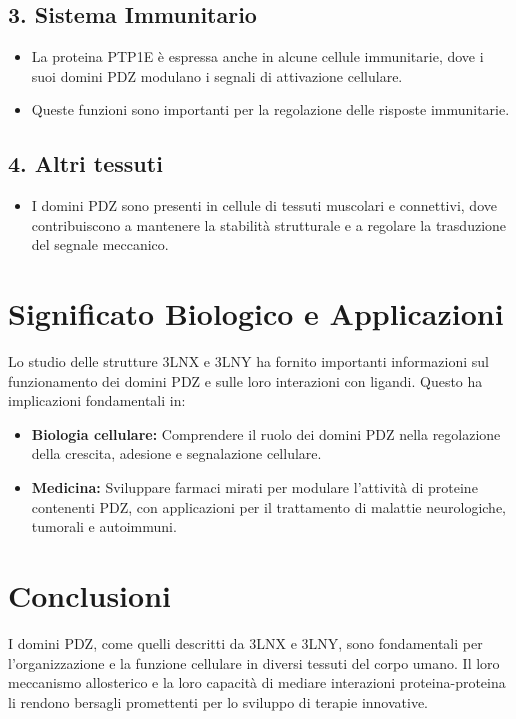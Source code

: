 \documentclass[Lau,binding=0.6cm,oneside,noexaminfo]{sapthesis}
\begin{document}
\subsection{3. Sistema Immunitario}
\begin{itemize}
    \item La proteina PTP1E è espressa anche in alcune cellule immunitarie, dove i suoi domini PDZ modulano i segnali di attivazione cellulare.
    \item Queste funzioni sono importanti per la regolazione delle risposte immunitarie.
\end{itemize}

\subsection{4. Altri tessuti}
\begin{itemize}
    \item I domini PDZ sono presenti in cellule di tessuti muscolari e connettivi, dove contribuiscono a mantenere la stabilità strutturale e a regolare la trasduzione del segnale meccanico.
\end{itemize}

\section{Significato Biologico e Applicazioni}
Lo studio delle strutture 3LNX e 3LNY ha fornito importanti informazioni sul funzionamento dei domini PDZ e sulle loro interazioni con ligandi. Questo ha implicazioni fondamentali in:
\begin{itemize}
    \item \textbf{Biologia cellulare:} Comprendere il ruolo dei domini PDZ nella regolazione della crescita, adesione e segnalazione cellulare.
    \item \textbf{Medicina:} Sviluppare farmaci mirati per modulare l'attività di proteine contenenti PDZ, con applicazioni per il trattamento di malattie neurologiche, tumorali e autoimmuni.
\end{itemize}

\section{Conclusioni}
I domini PDZ, come quelli descritti da 3LNX e 3LNY, sono fondamentali per l'organizzazione e la funzione cellulare in diversi tessuti del corpo umano. Il loro meccanismo allosterico e la loro capacità di mediare interazioni proteina-proteina li rendono bersagli promettenti per lo sviluppo di terapie innovative.
\end{document}
